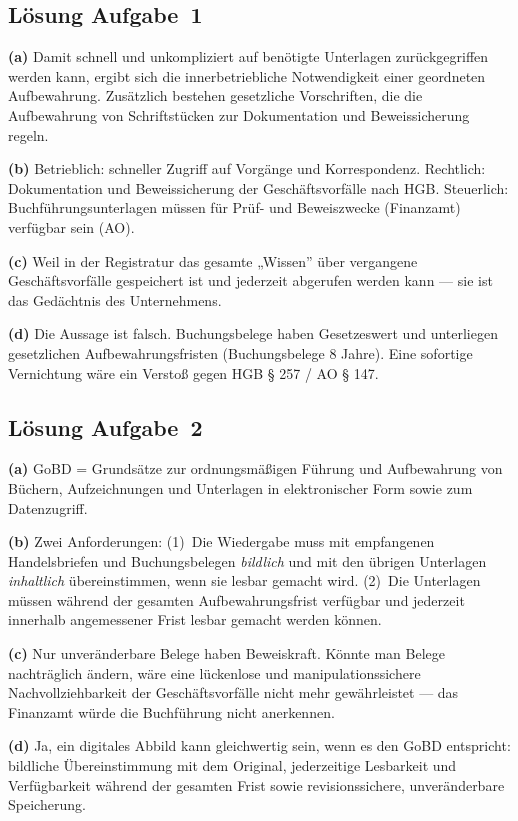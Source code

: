 \documentclass[11pt, a4paper]{article}
\begin{document}
\subsection*{Lösung Aufgabe~1}
\begin{loesung}
\textbf{(a)} Damit schnell und unkompliziert auf benötigte Unterlagen zurückgegriffen
werden kann, ergibt sich die innerbetriebliche Notwendigkeit einer geordneten
Aufbewahrung. Zusätzlich bestehen gesetzliche Vorschriften, die die Aufbewahrung von
Schriftstücken zur Dokumentation und Beweissicherung regeln.

\textbf{(b)} Betrieblich: schneller Zugriff auf Vorgänge und Korrespondenz. Rechtlich:
Dokumentation und Beweissicherung der Geschäftsvorfälle nach HGB. Steuerlich:
Buchführungsunterlagen müssen für Prüf- und Beweiszwecke (Finanzamt) verfügbar sein (AO).

\textbf{(c)} Weil in der Registratur das gesamte „Wissen” über vergangene
Geschäftsvorfälle gespeichert ist und jederzeit abgerufen werden kann --- sie ist das
Gedächtnis des Unternehmens.

\textbf{(d)} Die Aussage ist falsch. Buchungsbelege haben Gesetzeswert und unterliegen
gesetzlichen Aufbewahrungsfristen (Buchungsbelege 8 Jahre). Eine sofortige Vernichtung
wäre ein Verstoß gegen HGB § 257 / AO § 147.
\end{loesung}

\subsection*{Lösung Aufgabe~2}
\begin{loesung}
\textbf{(a)} GoBD = Grundsätze zur ordnungsmäßigen Führung und Aufbewahrung von Büchern,
Aufzeichnungen und Unterlagen in elektronischer Form sowie zum Datenzugriff.

\textbf{(b)} Zwei Anforderungen: (1)~Die Wiedergabe muss mit empfangenen Handelsbriefen
und Buchungsbelegen \emph{bildlich} und mit den übrigen Unterlagen \emph{inhaltlich}
übereinstimmen, wenn sie lesbar gemacht wird. (2)~Die Unterlagen müssen während der
gesamten Aufbewahrungsfrist verfügbar und jederzeit innerhalb angemessener Frist lesbar
gemacht werden können.

\textbf{(c)} Nur unveränderbare Belege haben Beweiskraft. Könnte man Belege nachträglich
ändern, wäre eine lückenlose und manipulationssichere Nachvollziehbarkeit der
Geschäftsvorfälle nicht mehr gewährleistet --- das Finanzamt würde die Buchführung nicht
anerkennen.

\textbf{(d)} Ja, ein digitales Abbild kann gleichwertig sein, wenn es den GoBD entspricht:
bildliche Übereinstimmung mit dem Original, jederzeitige Lesbarkeit und Verfügbarkeit
während der gesamten Frist sowie revisionssichere, unveränderbare Speicherung.
\end{loesung}
\end{document}
